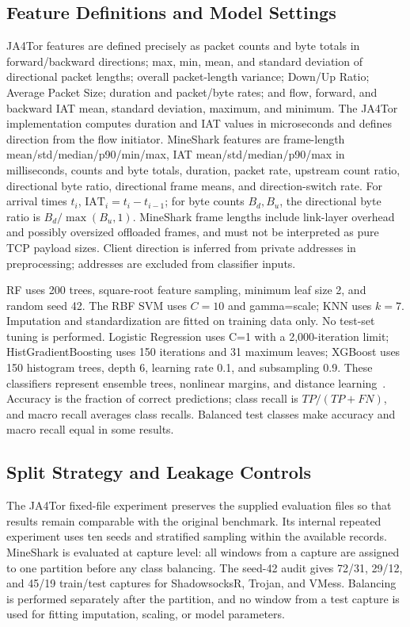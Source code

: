 \documentclass[conference]{IEEEtran}
\begin{document}
\subsection{Feature Definitions and Model Settings}
JA4Tor features are defined precisely as packet counts and byte totals in forward/backward directions; max, min, mean, and standard deviation of directional packet lengths; overall packet-length variance; Down/Up Ratio; Average Packet Size; duration and packet/byte rates; and flow, forward, and backward IAT mean, standard deviation, maximum, and minimum. The JA4Tor implementation computes duration and IAT values in microseconds and defines direction from the flow initiator. MineShark features are frame-length mean/std/median/p90/min/max, IAT mean/std/median/p90/max in milliseconds, counts and byte totals, duration, packet rate, upstream count ratio, directional byte ratio, directional frame means, and direction-switch rate. For arrival times $t_i$, $\mathrm{IAT}_i=t_i-t_{i-1}$; for byte counts $B_d,B_u$, the directional byte ratio is $B_d/\max(B_u,1)$. MineShark frame lengths include link-layer overhead and possibly oversized offloaded frames, and must not be interpreted as pure TCP payload sizes. Client direction is inferred from private addresses in preprocessing; addresses are excluded from classifier inputs.

RF uses 200 trees, square-root feature sampling, minimum leaf size 2, and random seed 42. The RBF SVM uses $C=10$ and gamma=scale; KNN uses $k=7$. Imputation and standardization are fitted on training data only. No test-set tuning is performed. Logistic Regression uses C=1 with a 2,000-iteration limit; HistGradientBoosting uses 150 iterations and 31 maximum leaves; XGBoost uses 150 histogram trees, depth 6, learning rate 0.1, and subsampling 0.9. These classifiers represent ensemble trees, nonlinear margins, and distance learning~\cite{breiman,cortes,cover,pedregosa}. Accuracy is the fraction of correct predictions; class recall is $TP/(TP+FN)$, and macro recall averages class recalls. Balanced test classes make accuracy and macro recall equal in some results.

\subsection{Split Strategy and Leakage Controls}
The JA4Tor fixed-file experiment preserves the supplied evaluation files so that results remain comparable with the original benchmark. Its internal repeated experiment uses ten seeds and stratified sampling within the available records. MineShark is evaluated at capture level: all windows from a capture are assigned to one partition before any class balancing. The seed-42 audit gives 72/31, 29/12, and 45/19 train/test captures for ShadowsocksR, Trojan, and VMess. Balancing is performed separately after the partition, and no window from a test capture is used for fitting imputation, scaling, or model parameters.
\end{document}
